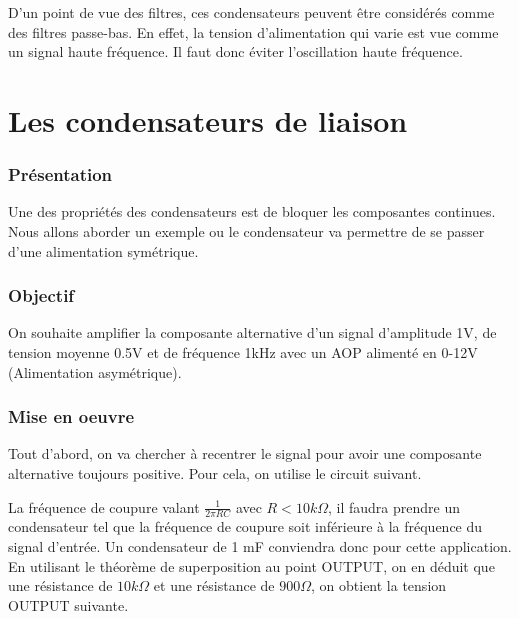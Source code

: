 D'un point de vue des filtres, ces condensateurs peuvent être considérés comme des filtres passe-bas. En effet, la tension d'alimentation qui varie est vue comme un signal haute fréquence. Il faut donc éviter l'oscillation haute fréquence.

\section{Les condensateurs de liaison}

\subsubsection{Présentation}

Une des propriétés des condensateurs est de bloquer les composantes continues.
Nous allons aborder un exemple ou le condensateur va permettre de se passer d'une alimentation symétrique. 

\subsubsection{Objectif}

On souhaite amplifier la composante alternative d'un signal d'amplitude 1V, de tension moyenne 0.5V et de fréquence 1kHz avec un AOP alimenté en 0-12V (Alimentation asymétrique).


\subsubsection{Mise en oeuvre}

Tout d'abord, on va chercher à recentrer le signal pour avoir une composante alternative toujours positive.
Pour cela, on utilise le circuit suivant.


La fréquence de coupure valant $\frac{1}{2\pi RC}$ avec $ R < 10 k\Omega$, il faudra prendre un condensateur tel que la fréquence de coupure soit inférieure à la fréquence du signal d'entrée. \n
Un condensateur de 1 mF conviendra donc pour cette application.\\

En utilisant le théorème de superposition au point OUTPUT, on en déduit que une résistance de $10 k\Omega$ et une résistance de $ 900 \Omega$, on obtient la tension OUTPUT suivante.

